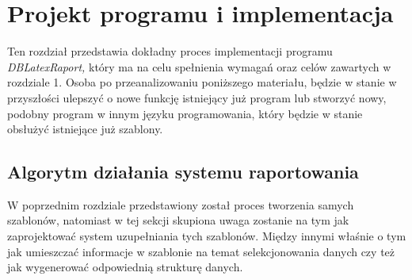\chapter{Projekt programu i implementacja}

Ten rozdział przedstawia dokładny proces implementacji programu \emph{DBLatexRaport,}  który ma na celu spełnienia wymagań oraz celów zawartych w rozdziale 1.  Osoba po przeanalizowaniu poniższego materiału, będzie w stanie w przyszłości ulepszyć o nowe funkcję istniejący już program lub stworzyć nowy, podobny program w innym języku programowania, który będzie w stanie obsłużyć istniejące już szablony. 

\section{Algorytm działania systemu raportowania}

W poprzednim rozdziale przedstawiony został proces tworzenia samych szablonów, natomiast w tej sekcji skupiona uwaga zostanie na tym jak zaprojektować system uzupełniania tych szablonów. Między innymi właśnie o tym jak umieszczać informacje w szablonie na temat selekcjonowania danych czy też jak wygenerować odpowiednią strukturę danych.

